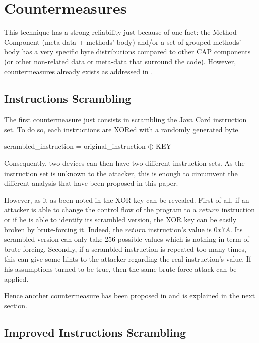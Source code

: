 \section{Countermeasures}

This technique has a strong reliability just because of one fact: the Method Component (meta-data +
methods' body) and/or a set of grouped methods' body  has a very specific byte distributions compared
to other CAP components (or other non-related data or meta-data that surround the code). However, countermeasures already exists as addressed in \cite{barbuthesis}
\cite{dynamicsyntax}. 

\subsection{Instructions Scrambling}
The first countermeasure just consists in scrambling the Java Card instruction set. To do so, each
instructions are XORed with a randomly generated byte. 
 
 \begin{center}
scrambled\_instruction = original\_instruction $\oplus$ KEY 
\end{center}

Consequently, two devices can then have two different instruction sets. As the instruction set is
unknown to the attacker, this is enough to circumvent the different analysis that have been
proposed in this paper.

However, as it as been noted in \cite{dynamicsyntax} the XOR key can be revealed. First of all, if
an attacker is able to change the control flow of the program to a $return$ instruction or if he is
able to identify its scrambled version, the XOR key can be easily broken by brute-forcing it.
Indeed, the $return$ instruction's value is $0x7A$. Its scrambled version can only take 256 possible
values which is nothing in term of brute-forcing.  
Secondly, if a scrambled instruction is repeated too many times, this can give some hints to the
attacker regarding the real instruction's value. If his assumptions turned to be true, then the same
brute-force attack can be applied.

Hence another countermeasure has been proposed in \cite{dynamicsyntax} and is explained in the next section.

\subsection{Improved Instructions Scrambling}

